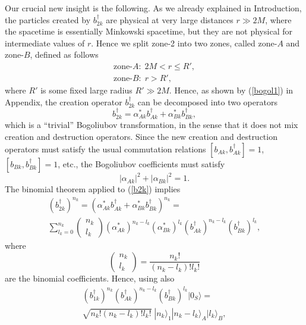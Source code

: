 \documentclass[aps,prd,onecolumn,groupedaddress,showkeys,12pt]{revtex4-2}
\begin{document}
Our crucial new insight is the following. As we already explained in Introduction,
the particles created by $b_{2k}^\dagger$ are physical at very large distances $r\gg 2M$, 
where the spacetime is essentially Minkowski spacetime, but they are not physical for intermediate values of $r$.
Hence we split zone-2 into two zones, called zone-$A$ and zone-$B$, defined as follows
\begin{equation}
\begin{array}{l}
 \text{zone-}A: \; 2M<r\le R', 
\\
 \text{zone-}B: \; r>R', 
\end{array}
\end{equation}
where $R'$ is some fixed large radius $R'\gg 2M$. Hence, as shown by (\ref{bogol1}) in Appendix, 
the creation operator $b_{2k}^\dagger$ can be decomposed into two operators 
\begin{equation}\label{b2k}
 b_{2k}^\dagger=\alpha_{Ak}^*b_{Ak}^\dagger + \alpha_{Bk}^*b_{Bk}^\dagger ,
\end{equation}
which is a ``trivial'' Bogoliubov transformation, in the sense that it does not mix creation and destruction operators.
Since the new creation and destruction operators must satisfy the usual commutation relations 
$[b_{Ak}, b_{Ak}^\dagger]=1$, $[b_{Bk}, b_{Bk}^\dagger]=1$, etc., the Bogoliubov coefficients must satisfy
\begin{equation}\label{sum_alpha=1}
 |\alpha_{Ak}|^2+|\alpha_{Bk}|^2 =1. 
\end{equation}
The binomial theorem applied to (\ref{b2k}) implies
\begin{eqnarray}
 &  (b_{2k}^\dagger)^{n_k}  = (\alpha_{Ak}^*b_{Ak}^\dagger + \alpha_{Bk}^*b_{Bk}^\dagger)^{n_k} =&
\\
& \displaystyle\sum_{l_k=0}^{n_k} \left( \begin{array}{c} n_k \\ l_k \end{array} \right) 
(\alpha_{Ak}^*)^{n_k-l_k} (\alpha_{Bk}^*)^{l_k}  (b_{Ak}^\dagger)^{n_k-l_k}  (b_{Bk}^\dagger)^{l_k} ,
\nonumber
\end{eqnarray}
where 
\begin{equation}
 \left( \begin{array}{c} n_k \\ l_k \end{array} \right) =\frac{n_k!}{(n_k-l_k)!l_k!}
\end{equation}
are the binomial coefficients. Hence, using also 
\begin{eqnarray}
& (b_{1k}^\dagger)^{n_k} (b_{Ak}^\dagger)^{n_k-l_k} (b_{Bk}^\dagger)^{l_k} |0_S\rangle = &
\nonumber \\
&\sqrt{n_k! (n_k-l_k)! l_k!}\; |n_k\rangle_1 |n_k-l_k\rangle_A |l_k\rangle_B , &
\end{eqnarray}
\end{document}
